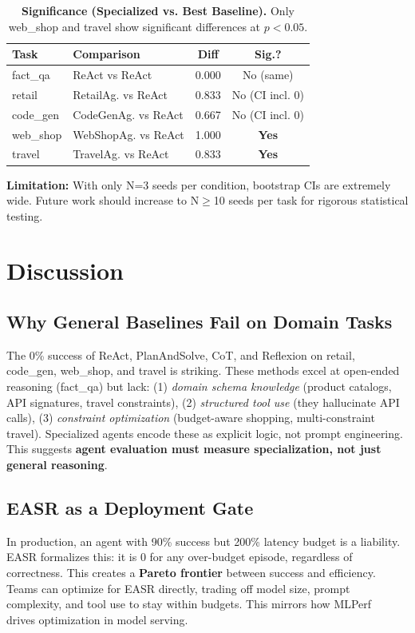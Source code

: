 \documentclass[letterpaper, 10 pt, conference]{ieeeconf}
\newcommand{\easr}{\textsc{EASR}}
\begin{document}
\begin{table}[t]
\centering
\caption{\textbf{Significance (Specialized vs. Best Baseline).} Only web\_shop and travel show significant differences at $p<0.05$.}
\label{tab:sig}
\footnotesize
\setlength{\tabcolsep}{3.5pt}
\begin{tabular}{llcc}
\toprule
\textbf{Task} & \textbf{Comparison} & \textbf{Diff} & \textbf{Sig.?} \\
\midrule
fact\_qa & ReAct vs ReAct & 0.000 & No (same) \\
retail & RetailAg. vs ReAct & 0.833 & No (CI incl. 0) \\
code\_gen & CodeGenAg. vs ReAct & 0.667 & No (CI incl. 0) \\
web\_shop & WebShopAg. vs ReAct & 1.000 & \textbf{Yes} \\
travel & TravelAg. vs ReAct & 0.833 & \textbf{Yes} \\
\bottomrule
\end{tabular}
\end{table}

\textbf{Limitation:} With only N=3 seeds per condition, bootstrap CIs are extremely wide. Future work should increase to N$\ge$10 seeds per task for rigorous statistical testing.

\section{Discussion}
\label{sec:discussion}

\subsection{Why General Baselines Fail on Domain Tasks}
The 0\% success of ReAct, PlanAndSolve, CoT, and Reflexion on retail, code\_gen, web\_shop, and travel is striking. These methods excel at open-ended reasoning (fact\_qa) but lack: (1) \textit{domain schema knowledge} (product catalogs, API signatures, travel constraints), (2) \textit{structured tool use} (they hallucinate API calls), (3) \textit{constraint optimization} (budget-aware shopping, multi-constraint travel). Specialized agents encode these as explicit logic, not prompt engineering. This suggests \textbf{agent evaluation must measure specialization, not just general reasoning}.

\subsection{\easr{} as a Deployment Gate}
In production, an agent with 90\% success but 200\% latency budget is a liability. \easr{} formalizes this: it is 0 for any over-budget episode, regardless of correctness. This creates a \textbf{Pareto frontier} between success and efficiency. Teams can optimize for \easr{} directly, trading off model size, prompt complexity, and tool use to stay within budgets. This mirrors how MLPerf~\cite{mattson2020mlperf} drives optimization in model serving.
\end{document}
